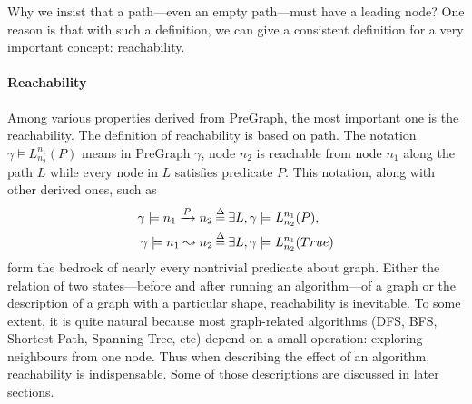 Why we insist that a path---even an empty path---must have a leading
node? One reason is that with such a definition, we can give a
consistent definition for a very important concept: reachability.

\paragraph{Reachability}
Among various properties derived from PreGraph, the most important one
is the reachability. The definition of reachability is based on
path. The notation $\gamma \models L_{n_2}^{n_1}(P)$ means in PreGraph
$\gamma$, node $n_2$ is reachable from node $n_1$ along the path $L$
while every node in $L$ satisfies predicate $P$. This notation, along
with other derived ones, such as
\begin{equation*}
\begin{split}
\gamma\models n_1 \xrightarrow{P} n_2 &\mathbin{\stackrel{\Delta}{=}} \exists L, \gamma \models L_{n_2}^{n_1}(P),\\
\gamma\models n_1 \leadsto n_2 &\mathbin{\stackrel{\Delta}{=}} \exists L, \gamma \models L_{n_2}^{n_1}(True)
\end{split}
\end{equation*}
form the bedrock of nearly every nontrivial predicate about
graph. Either the relation of two states---before and after running an
algorithm---of a graph or the description of a graph with a particular
shape, reachability is inevitable. To some extent, it is quite natural
because most graph-related algorithms (DFS, BFS, Shortest Path,
Spanning Tree, etc) depend on a small operation: exploring neighbours
from one node. Thus when describing the effect of an algorithm,
reachability is indispensable. Some of those descriptions are
discussed in later sections.

